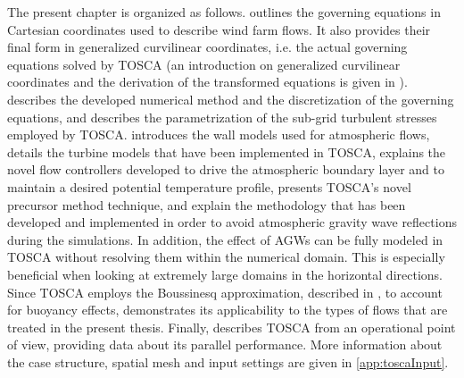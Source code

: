 The present chapter is organized as follows.  outlines the governing equations in Cartesian coordinates used to describe wind farm flows. It also provides their final form in generalized curvilinear coordinates, i.e. the actual governing equations solved by TOSCA (an introduction on generalized curvilinear coordinates and the derivation of the transformed equations is given in ).  describes the developed numerical method and the discretization of the governing equations, and  describes the parametrization of the sub-grid turbulent stresses employed by TOSCA.  introduces the wall models used for atmospheric flows,  details the turbine models that have been implemented in TOSCA,  explains the novel flow controllers developed to drive the atmospheric boundary layer and to maintain a desired potential temperature profile,  presents TOSCA's novel precursor method technique, and  explain the methodology that has been developed and implemented in order to avoid atmospheric gravity wave reflections during the simulations. In addition, the effect of AGWs can be fully modeled in TOSCA without resolving them within the numerical domain. This is especially beneficial when looking at extremely large domains in the horizontal directions. Since TOSCA employs the Boussinesq approximation, described in , to account for buoyancy effects,  demonstrates its applicability to the types of flows that are treated in the present thesis. Finally,  describes TOSCA from an operational point of view, providing data about its parallel performance. More information about the case structure, spatial mesh and input settings are given in \ref{app:toscaInput}. 

